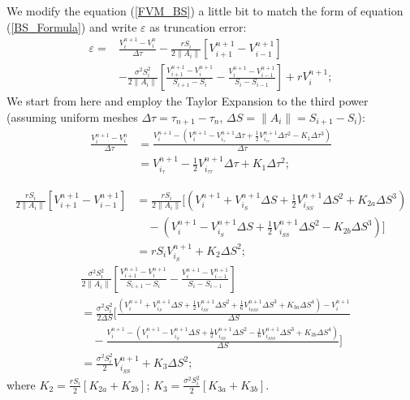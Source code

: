 \documentclass[final]{siamltex}
\begin{document}
We modify the equation (\ref{FVM_BS}) a little bit to match the form of equation (\ref{BS_Formula}) and write $\varepsilon$ as truncation error:
\begin{equation}
\begin{split}
\varepsilon = & \frac{V_i^{n+1}- V_i^{n}}{\Delta \tau} -  \frac{rS_i}{2\|A_i\|}[V^{n+1}_{i+1}-V^{n+1}_{i-1}]\\
&-\frac{\sigma^2 S_i^2}{2\|A_i\|}[\frac{V^{n+1}_{i+1}-V^{n+1}_i}{S_{i+1}-S_i} 
- \frac{V^{n+1}_{i}-V^{n+1}_{i-1}}{S_{i}-S_{i-1}}]+ rV_i^{n+1};
\end{split}
\label{Truncation}
\end{equation}
We start from here and employ the Taylor Expansion to the third power (assuming uniform meshes $\Delta \tau = \tau_{n+1}-\tau_{n}$, $\Delta S=\|A_i\|=S_{i+1}-S_i$):
\begin{equation}
\begin{split}
\frac{V_i^{n+1}- V_i^{n}}{\Delta \tau} &= \frac{V_i^{n+1}-(V_i^{n+1}- V_{i_\tau}^{n+1}\Delta \tau+\frac{1}{2}V_{i_{\tau \tau}}^{n+1}\Delta \tau^2-K_1\Delta \tau^3)}{\Delta \tau}\\ 
&=V_{i_\tau}^{n+1}-\frac{1}{2}V_{i_{\tau \tau}}^{n+1}\Delta \tau + K_1 \Delta \tau^2;
\end{split}
\label{Truncation1}
\end{equation}

\begin{equation}
\begin{split}
\frac{rS_i}{2\|A_i\|}[V^{n+1}_{i+1}-V^{n+1}_{i-1}]&= \frac{rS_i}{2\|A_i\|}[(V^{n+1}_{i}+ V^{n+1}_{i_{S}}\Delta S+\frac{1}{2}V^{n+1}_{i_{SS}}\Delta S^2+ K_{2a} \Delta S^3 )\\ 
&\quad -(V^{n+1}_{i}- V^{n+1}_{i_{S}}\Delta S+\frac{1}{2}V^{n+1}_{i_{SS}}\Delta S^2- K_{2b} \Delta S^3 )]\\
&=rS_iV^{n+1}_{i_{S}}+ K_2 \Delta S^2;
\end{split}
\label{Truncation2}
\end{equation}
\begin{equation}
\begin{split}
&\frac{\sigma^2 S_i^2}{2\|A_i\|}[\frac{V^{n+1}_{i+1}-V^{n+1}_i}{S_{i+1}-S_i}- \frac{V^{n+1}_{i}-V^{n+1}_{i-1}}{S_{i}-S_{i-1}}]\\
&=
\frac{\sigma^2 S_i^2}{2\Delta S} [\frac{(V^{n+1}_{i}+ V^{n+1}_{i_{S}}\Delta S+\frac{1}{2}V^{n+1}_{i_{SS}}\Delta S^2+ \frac{1}{6}V^{n+1}_{i_{SSS}}\Delta S^3+K_{3a} \Delta S^4)-V^{n+1}_i}{\Delta S}\\
&\quad -\frac{V^{n+1}_i-(V^{n+1}_{i}- V^{n+1}_{i_{S}}\Delta S+\frac{1}{2}V^{n+1}_{i_{SS}}\Delta S^2-\frac{1}{6}V^{n+1}_{i_{SSS}}\Delta S^3 +K_{3b} \Delta S^4)}{\Delta S}]\\
&= \frac{\sigma^2 S_i^2}{2}V^{n+1}_{i_{SS}}+K_3\Delta S^2;
\end{split}
\label{Truncation3}
\end{equation}
where $K_2=\frac{rS_i}{2}[K_{2a}+K_{2b}]$; $K_3=\frac{\sigma^2 S_i^2}{2}[K_{3a}+K_{3b}]$.
\end{document}
